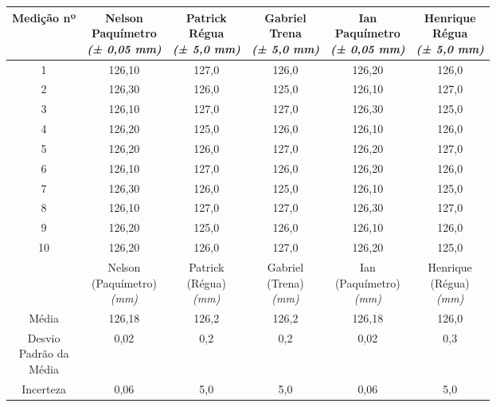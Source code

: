 \documentclass{article}
\begin{document}
\begin{table}[h!]
\centering
\begin{tabular}{c c c c c c }
\toprule
Medição nº & \shortstack{Nelson\\Paquímetro\\\textit{(± 0,05 mm)}} & \shortstack{Patrick\\Régua\\\textit{(± 5,0 mm)}} & \shortstack{Gabriel\\Trena\\\textit{(± 5,0 mm)}} & \shortstack{Ian\\Paquímetro\\\textit{(± 0,05 mm)}} & \shortstack{Henrique\\Régua\\\textit{(± 5,0 mm)}}\\
\midrule
1 & 126,10 & 127,0 & 126,0 & 126,20 & 126,0\\
2 & 126,30 & 126,0 & 125,0 & 126,10 & 127,0\\
3 & 126,10 & 127,0 & 127,0 & 126,30 & 125,0\\
4 & 126,20 & 125,0 & 126,0 & 126,10 & 126,0\\
5 & 126,20 & 126,0 & 127,0 & 126,20 & 127,0\\
6 & 126,10 & 127,0 & 126,0 & 126,20 & 126,0\\
7 & 126,30 & 126,0 & 125,0 & 126,10 & 125,0\\
8 & 126,10 & 127,0 & 127,0 & 126,30 & 127,0\\
9 & 126,20 & 125,0 & 126,0 & 126,10 & 126,0\\
10 & 126,20 & 126,0 & 127,0 & 126,20 & 125,0\\
\midrule
&\shortstack{Nelson\\(Paquímetro)\\\textit{(mm)}} & \shortstack{Patrick\\(Régua)\\\textit{(mm)}} & \shortstack{Gabriel\\(Trena)\\\textit{(mm)}} & \shortstack{Ian\\(Paquímetro)\\\textit{(mm)}} & \shortstack{Henrique\\(Régua)\\\textit{(mm)}}\\
\midrule
Média & 126,18 & 126,2 & 126,2 & 126,18 & 126,0\\[3pt]
\shortstack{Desvio\\Padrão da\\Média} & 0,02 & 0,2 & 0,2 & 0,02 & 0,3\\[3pt]
Incerteza & 0,06 & 5,0 & 5,0 & 0,06 & 5,0\\
\bottomrule
\end{tabular}
\end{table}
\end{document}
